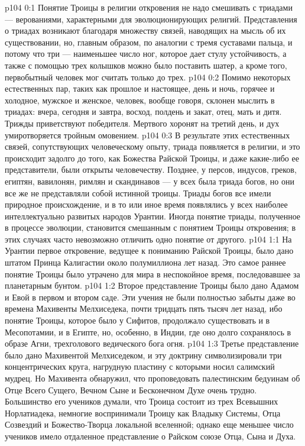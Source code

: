 \author{Мелхиседек}
\vs p104 0:1 Понятие Троицы в религии откровения не надо смешивать с триадами --- верованиями, характерными для эволюционирующих религий. Представления о триадах возникают благодаря множеству связей, наводящих на мысль об их существовании, но, главным образом, по аналогии с тремя суставами пальца, и потому что три --- наименьшее число ног, которое дает стулу устойчивость, а также с помощью трех колышков можно было поставить шатер, а кроме того, первобытный человек мог считать только до трех.
\vs p104 0:2 Помимо некоторых естественных пар, таких как прошлое и настоящее, день и ночь, горячее и холодное, мужское и женское, человек, вообще говоря, склонен мыслить в триадах: вчера, сегодня и завтра, восход, полдень и закат, отец, мать и дитя. Трижды приветствуют победителя. Мертвого хоронят на третий день, и дух умиротворяется тройным омовением.
\vs p104 0:3 В результате этих естественных связей, сопутствующих человеческому опыту, триада появляется в религии, и это происходит задолго до того, как Божества Райской Троицы, и даже какие\hyp{}либо ее представители, были открыты человечеству. Позднее, у персов, индусов, греков, египтян, вавилонян, римлян и скандинавов --- у всех была триада богов, но они все же не представляли собой истинной троицы. Триады богов все имели природное происхождение, и в то или иное время появлялись у всех наиболее интеллектуально развитых народов Урантии. Иногда понятие триады, полученное в процессе эволюции, становится смешанным с понятием Троицы откровения; в этих случаях часто невозможно отличить одно понятие от другого.
\vs p104 1:1 На Урантии первое откровение, ведущее к пониманию Райской Троицы, было дано штатом Принца Калигастии около полумиллиона лет назад. Это самое раннее понятие Троицы было утрачено для мира в неспокойное время, последовавшее за планетарным бунтом.
\vs p104 1:2 Второе представление Троицы было дано Адамом и Евой в первом и втором саде. Эти учения не были полностью забыты даже во времена Махивенты Мелхиседека, почти тридцать пять тысяч лет назад, ибо понятие Троицы, которое было у Сифитов, продолжало существовать и в Месопотамии, и в Египте, но, особенно, в Индии, где оно долго сохранялось в образе Агни, трехголового ведического бога огня.
\vs p104 1:3 Третье представление было дано Махивентой Мелхиседеком, и эту доктрину символизировали три концентрических круга, нагрудную пластину с которыми носил салимский мудрец. Но Махивента обнаружил, что проповедовать палестинским бедуинам об Отце Всего Сущего, Вечном Сыне и Бесконечном Духе очень трудно. Большинство его учеников думали, что Троица состоит из трех Всевышних Норлатиадека, немногие воспринимали Троицу как Владыку Системы, Отца Созвездий и Божество\hyp{}Творца локальной вселенной; однако еще меньшее число учеников имело отдаленное представление о Райском союзе Отца, Сына и Духа.
